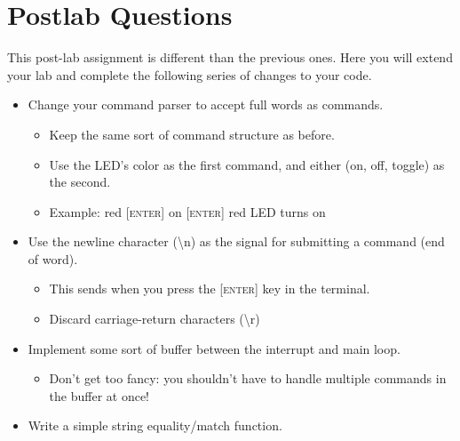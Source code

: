 \documentclass[openany,11pt,fleqn]{book} %
\begin{document}
\section{\color{blue}Postlab Questions}
\begin{question}[Postlab 4]
	This post-lab assignment is different than the previous ones. Here you will extend your lab and complete the following series of changes to your code.
	\begin{itemize}
		\item Change your command parser to accept full words as commands.
		\begin{itemize}
			\item Keep the same sort of command structure as before.
			\item Use the LED's color as the first command, and either (on, off, toggle) as the second.
			\item Example: red \textsc{[enter]} on \textsc{[enter]} \textrightarrow{} red LED turns on
		\end{itemize}
		\item Use the newline character (\textbackslash n) as the signal for submitting a command (end of word).
		\begin{itemize}
			\item This sends when you press the \textsc{[enter]} key in the terminal.
			\item Discard carriage-return characters (\textbackslash r)
		\end{itemize}
		\item Implement some sort of buffer between the interrupt and main loop.
		\begin{itemize}
			\item Don't get too fancy: you shouldn't have to handle multiple commands in the buffer at once!
		\end{itemize}
		\item Write a simple string equality/match function. 
	\end{itemize}
\end{question}


\end{document}
